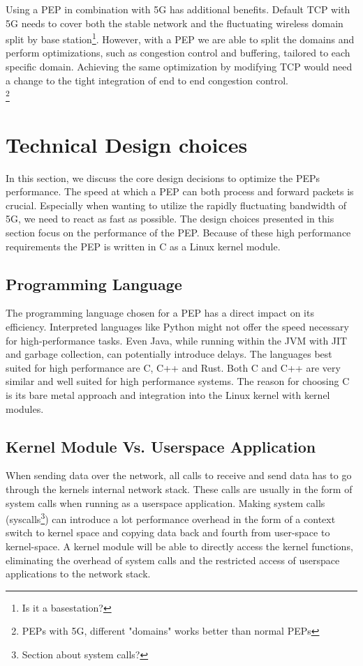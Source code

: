 \documentclass[a4paper,english, 11pt]{report}
\begin{document}
Using a PEP in combination with 5G has additional benefits. Default TCP with 5G needs to cover both the stable network and the fluctuating wireless domain split by base station\footnote{Is it a basestation?}. However, with a PEP we are able to split the domains and perform optimizations, such as congestion control and buffering, tailored to each specific domain. Achieving the same optimization by modifying TCP would need a change to the tight integration of end to end congestion control.\\ \footnote{PEPs with 5G, different "domains" works better than normal PEPs}

\section{Technical Design choices }
In this section, we discuss the core design decisions to optimize the PEPs performance.
 The speed at which a PEP can both process and forward packets is crucial. Especially when wanting to utilize the rapidly fluctuating bandwidth of 5G, we need to react as fast as possible. The design choices presented in this section focus on the performance of the PEP. Because of these high performance requirements the PEP is written in C as a Linux kernel module. 

\subsection{Programming Language}
The programming language chosen for a PEP has a direct impact on its efficiency. Interpreted languages like Python might not offer the speed necessary for high-performance tasks. Even Java, while running within the JVM with JIT and garbage collection, can potentially introduce delays. The languages best suited for high performance are C, C++ and Rust. Both C and C++ are very similar and well suited for high performance systems. The reason for choosing C is its bare metal approach and integration into the Linux kernel with kernel modules.

\subsection{Kernel Module Vs. Userspace Application}
When sending data over the network, all calls to receive and send data has to go through the kernels internal network stack. These calls are usually in the form of system calls when running as a userspace application. Making system calls (syscalls\footnote{Section about system calls?}) can introduce a lot performance overhead in the form of a context switch to kernel space and copying data back and fourth from user-space to kernel-space. A kernel module will be able to directly access the kernel functions, eliminating the overhead of system calls and the restricted access of userspace applications to the network stack.\\
\end{document}
